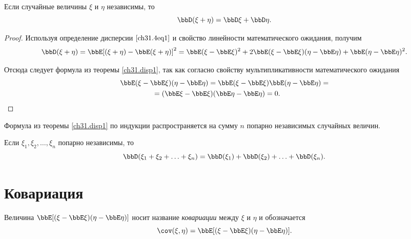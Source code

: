 \begin{thm}\label{ch31.disp1}
Если случайные величины $\xi$ и $\eta$ независимы, то $$\bbD(\xi + \eta) = \bbD\xi + \bbD\eta.$$
\end{thm}
\begin{proof}
Используя определение дисперсии $\eqref{ch31.4eq1}$ и свойство линейности математического ожидания, получим
$$
\bbD(\xi + \eta) = \bbE[(\xi + \eta) - \bbE(\xi + \eta)]^2 = \bbE(\xi - \bbE\xi)^2 + 2\bbE(\xi - \bbE\xi)(\eta - \bbE\eta) + \bbE(\eta  - \bbE\eta)^2.
$$

Отсюда следует формула из теоремы \ref{ch31.disp1}, так как согласно свойству мультипликативности математического ожидания
\begin{multline*}
\bbE(\xi - \bbE\xi)(\eta - \bbE\eta) = \bbE(\xi - \bbE\xi)\bbE(\eta - \bbE\eta) =\\= (\bbE\xi - \bbE\xi)(\bbE\eta - \bbE\eta) = 0.\tag*{\qedhere}
\end{multline*}
\end{proof}

Формула из теоремы \ref{ch31.disp1} по индукции распространяется на сумму $n$ попарно независимых случайных величин. 
\begin{cons}\label{ch31.disp13}
Если $\xi_1,\xi_2, \ldots, \xi_n$ попарно независимы, то 
$$
\bbD(\xi_1 + \xi_2 + \ldots + \xi_n) = \bbD(\xi_1) + \bbD(\xi_2) + \ldots + \bbD(\xi_n).
$$
\end{cons}

\section{Ковариация}
\begin{defn}
Величина $\bbE[(\xi - \bbE\xi)(\eta - \bbE\eta)]$ носит название \textit{ковариации} между $\xi$ и $\eta$ и обозначается $$\cov (\xi,\eta) = \bbE[(\xi - \bbE\xi)(\eta - \bbE\eta)].$$
\end{defn}

